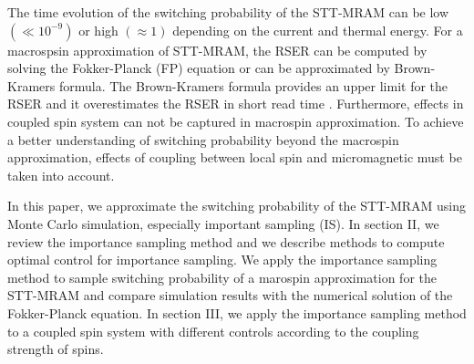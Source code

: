 \documentclass[journal,transmag]{IEEEtran}
\begin{document}
The time evolution of the switching probability of the STT-MRAM can be low $(\ll 10^{-9})$ or high $(\approx 1)$ depending on the current and thermal energy. For a macrospsin approximation of STT-MRAM, the RSER can be computed by solving the Fokker-Planck (FP) equation or can be approximated by Brown-Kramers formula. The Brown-Kramers formula provides an upper limit for the RSER and it overestimates the RSER in short read time  \cite{6242414}. Furthermore, effects in coupled spin system can not be captured in macrospin approximation. To achieve a better understanding of switching probability beyond the macrospin approximation, effects of coupling between local spin and micromagnetic  must be taken into account. 

In this paper, we approximate the switching probability of the STT-MRAM using Monte Carlo simulation, especially important sampling (IS). In section II, we review the importance sampling method and we describe methods to compute optimal control for importance sampling. We apply the importance sampling method to sample switching probability of a marospin approximation for the STT-MRAM and compare simulation results with the numerical solution of the Fokker-Planck equation. In section III, we apply the importance sampling method to a coupled spin system with different controls according to the coupling strength of spins. 







%
%
\end{document}
